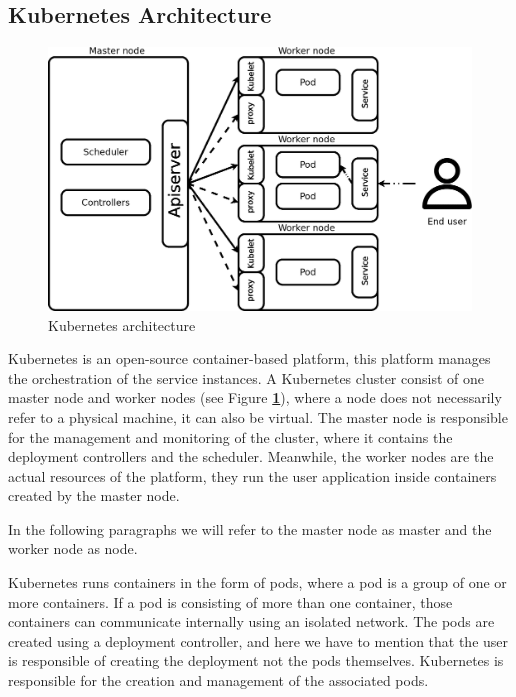 \documentclass[letterpaper,twocolumn,10pt]{article}
\let\origref\ref
\def\ref#1{\textbf{\origref{#1}}}
\begin{document}
\subsection{Kubernetes Architecture}

\begin{figure}[t]
  \centering
  \includegraphics[width=\linewidth]{images/arch.png}
  \caption{Kubernetes architecture} 
  \label{fig:arch}
\end{figure}

Kubernetes is an open-source container-based platform, this platform
manages the orchestration of the service instances. A Kubernetes
cluster consist of one master node and worker nodes (see Figure
\ref{fig:arch}), where a node does not necessarily refer to a physical
machine, it can also be virtual. The master node is responsible for
the management and monitoring of the cluster, where it contains the
deployment controllers and the scheduler. Meanwhile, the worker nodes
are the actual resources of the platform, they run the user
application inside containers created by the master node.

In the following paragraphs we will refer to the master node as master
and the worker node as node.

Kubernetes runs containers in the form of pods, where a pod is a group
of one or more containers. If a pod is consisting of more than one
container, those containers can communicate internally using an
isolated network. The pods are created using a deployment controller,
and here we have to mention that the user is responsible of creating
the deployment not the pods themselves. Kubernetes is responsible for
the creation and management of the associated pods.
\end{document}
